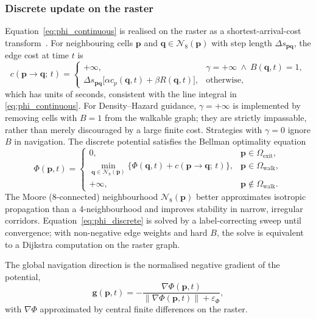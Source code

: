 \documentclass[preprint,12pt]{elsarticle}
\providecommand{\FloatBarrier}{}
\let\origsubsubsection\subsubsection
\renewcommand{\subsubsection}{\FloatBarrier\origsubsubsection}
\begin{document}
\subsubsection{Discrete update on the raster}
\label{sec:phi_discrete}

Equation~\eqref{eq:phi_continuous} is realised on the raster as a
shortest-arrival-cost transform~\citep{Sethian1996FastMarching}. For
neighbouring cells $\mathbf{p}$ and
$\mathbf{q} \in \mathcal{N}_8(\mathbf{p})$ with step length
$\Delta s_{\mathbf{pq}}$, the edge cost at time $t$ is
\begin{equation}
c(\mathbf{p} \to \mathbf{q};\, t) =
\begin{cases}
+\infty,
& \gamma=+\infty \ \wedge\ B(\mathbf{q},t)=1,\\[4pt]
\Delta s_{\mathbf{pq}}
\big[\alpha c_p(\mathbf{q},t)+\beta R(\mathbf{q},t)\big],
& \text{otherwise},
\end{cases}
\label{eq:edge_cost}
\end{equation}
which has units of seconds, consistent with the line integral in
\eqref{eq:phi_continuous}. For Density--Hazard guidance,
$\gamma=+\infty$ is implemented by removing cells with $B=1$ from the
walkable graph; they are strictly impassable, rather than merely
discouraged by a large finite cost. Strategies with $\gamma=0$ ignore
$B$ in navigation.
The discrete potential satisfies the Bellman optimality equation
\begin{equation}
\Phi(\mathbf{p}, t) =
\begin{cases}
0, & \mathbf{p} \in \Omega_{\mathrm{exit}},\\[4pt]
\displaystyle
\min_{\mathbf{q} \in \mathcal{N}_8(\mathbf{p})}
\Big\{ \Phi(\mathbf{q}, t) + c(\mathbf{p} \to \mathbf{q};\, t) \Big\},
& \mathbf{p} \in \Omega_{\mathrm{walk}},\\[8pt]
+\infty, & \mathbf{p} \notin \Omega_{\mathrm{walk}}.
\end{cases}
\label{eq:phi_discrete}
\end{equation}
The Moore (8-connected) neighbourhood $\mathcal{N}_8(\mathbf{p})$
better approximates isotropic propagation than a 4-neighbourhood and
improves stability in narrow, irregular corridors.
Equation~\eqref{eq:phi_discrete} is solved by a label-correcting sweep
until convergence; with non-negative edge weights and hard $B$, the
solve is equivalent to a Dijkstra computation on the raster graph.

The global navigation direction is the normalised negative gradient of
the potential,
\begin{equation}
\mathbf{g}(\mathbf{p}, t) = -\frac{\nabla\Phi(\mathbf{p}, t)}
{\|\nabla\Phi(\mathbf{p}, t)\| + \varepsilon_\Phi},
\label{eq:nav_dir}
\end{equation}
with $\nabla\Phi$ approximated by central finite differences on the
raster.
\end{document}

